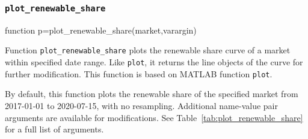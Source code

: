 \documentclass[10pt]{article}
\newcommand{\matlab}{\textsc{MATLAB}}
\numberwithin{equation}{section}
\numberwithin{table}{section}
\numberwithin{figure}{section}
\begin{document}
\subsubsection{\texttt{plot\_renewable\_share}}\label{func:plot_renewable_share}

\begin{Code}
function p=plot_renewable_share(market,varargin)
\end{Code}

Function \verb!plot_renewable_share! plots the renewable share curve of a market within specified date range. Like \verb!plot!, it returns the line objects of the curve for further modification. This function is based on \matlab{} function \verb!plot!.

By default, this function plots the renewable share of the specified market from 2017-01-01 to 2020-07-15, with no resampling. Additional name-value pair arguments are available for modifications. See Table~\ref{tab:plot_renewable_share} for a full list of arguments.
\end{document}
